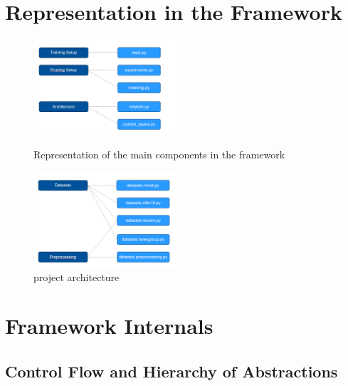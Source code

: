 \section{Representation in the Framework}
\begin{figure}
	\begin{minipage}{0.45\textwidth}
		\centering
		\includegraphics[width=200px]{gfx/chp_5_setups.png}
		\caption{Representation of the main components in the framework}
		\label{fig:Setup Representation}
	\end{minipage}\hfill
	\begin{minipage}{0.45\textwidth}
		\centering
		\includegraphics[width=200px]{gfx/chp_5_datasets.png}
		\caption{project architecture}
		\label{fig:Dataset Representation}
	\end{minipage}
\end{figure}

\section{Framework Internals}
\subsection{Control Flow and Hierarchy of Abstractions}


